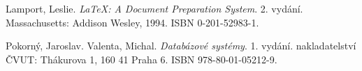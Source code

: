 \documentclass[12pt,a4paper]{article}
\theoremstyle{definition}
\begin{document}

\newpage
\renewcommand{\refname}{Seznam použité literatury}
\begin{thebibliography}{99}
  {\sc Lamport,} Leslie.
  \emph{\LaTeX: A Document Preparation System}.
  2. vydání.
  Massachusetts: Addison Wesley, 1994.
  ISBN 0-201-52983-1.

	{\sc Pokorný,} Jaroslav.
	{\sc Valenta,} Michal.
	\emph{Databázové systémy}.
	1. vydání.
	nakladatelství ČVUT: Thákurova 1, 160 41 Praha 6.
	ISBN 978-80-01-05212-9.


\end{thebibliography}
\end{document}
